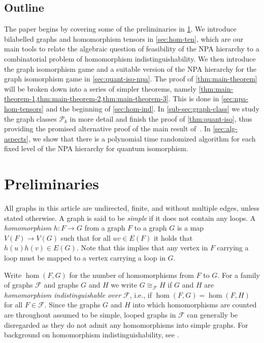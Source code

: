 \documentclass[a4paper,onecolumn,11pt,accepted=2026-01-06]{quantumarticle}
\theoremstyle{plain}
\theoremstyle{remark}
\theoremstyle{definition}
\def\calP{{\mathcal P}} \def\calQ{{\mathcal Q}} \def\calR{{\mathcal R}}
\begin{document}
\subsection{Outline}
The paper begins by covering some of the preliminaries in \cref{sec:preliminaries}. We introduce bilabelled graphs and homomorphism tensors in \cref{sec:hom-ten}, which are our main tools to relate the algebraic question of feasibility of the NPA hierarchy to a combinatorial problem of homomorphism indistinguishability. We then introduce the graph isomorphism game and a suitable version of the NPA hierarchy for the graph isomorphism game in \cref{sec:quant-iso-npa}. The proof of \cref{thm:main-theorem} will be broken down into a series of simpler theorems, namely \cref{thm:main-theorem-1,thm:main-theorem-2,thm:main-theorem-3}. 
This is done in \cref{sec:npa-hom-tensors} and the beginning of \cref{sec:hom-ind}. In \cref{sub-sec:graph-class} we study the graph classes $\calP_k$ in more detail and finish the proof of \cref{thm:quant-iso}, thus providing the promised alternative proof of the main result of~\cite{david-laura}. In \cref{sec:alg-aspects}, we show that there is a polynomial time randomized algorithm for each fixed level of the NPA hierarchy for quantum isomorphism.

\section{Preliminaries}\label{sec:preliminaries}

All graphs in this article are undirected, finite, and without multiple edges, unless stated otherwise. A graph is said to be \emph{simple} if it does not contain any loops. 
A \emph{homomorphism} $h \colon F \to G$ from a graph $F$ to a graph $G$ is a map $V(F) \to V(G)$ such that for all $uv \in E(F)$ it holds that $h(u)h(v) \in E(G)$. Note that this implies that any vertex in $F$ carrying a loop must be mapped to a vertex carrying a loop in $G$.

Write $\hom(F, G)$ for the number of homomorphisms from $F$ to $G$. For a family of graphs $\mathcal{F}$ and graphs $G$ and $H$ we write $G \cong_{\mathcal{F}} H$ if $G$ and $H$ are \emph{homomorphism indistinguishable over $\mathcal{F}$}, i.e., if $\hom(F, G) = \hom(F, H)$ for all $F \in \mathcal{F}$.
Since the graphs $G$ and $H$ into which homomorphisms are counted are throughout assumed to be simple, looped graphs in $\mathcal{F}$ can generally be disregarded as they do not admit any homomorphisms into simple graphs.
For background on homomorphism indistinguishability, see \cite{seppelt_homomorphism_2024}.
\end{document}

